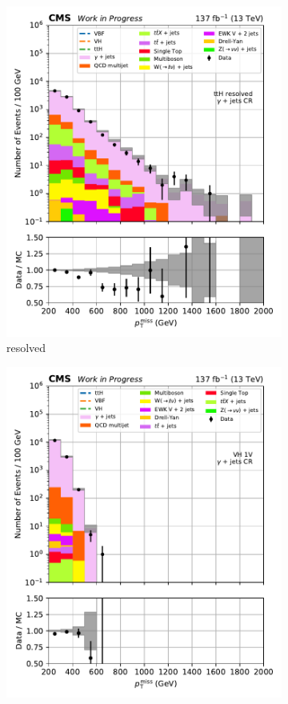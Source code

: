 \begin{figure}[htbp]
\begin{subfigure}[b]{0.24\textwidth}
        \includegraphics[width=\textwidth]{figures/region_plots/2016to18/region_5/ttH_resolved.pdf}
        \caption{\ttH resolved}
    \end{subfigure}
    \hfill
    \begin{subfigure}[b]{0.24\textwidth}
        \includegraphics[width=\textwidth]{figures/region_plots/2016to18/region_5/VH_1V.pdf}

\end{subfigure}
\end{figure}
